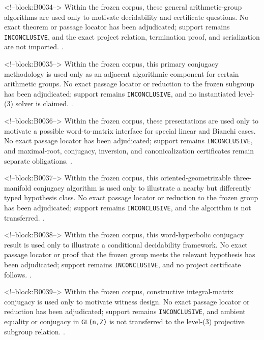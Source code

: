 \documentclass[11pt,a4paper]{article}
\begin{document}
<!--block:B0034-->
Within the frozen corpus, these general arithmetic-group algorithms are used only to motivate decidability and certificate questions. No exact theorem or passage locator has been adjudicated; support remains \texttt{INCONCLUSIVE}, and the exact project relation, termination proof, and serialization are not imported.
\citep{P29-S11}.

<!--block:B0035-->
Within the frozen corpus, this primary conjugacy methodology is used only as an adjacent algorithmic component for certain arithmetic groups. No exact passage locator or reduction to the frozen subgroup has been adjudicated; support remains \texttt{INCONCLUSIVE}, and no instantiated level-(3) solver is claimed.
\citep{P29-S15}.

<!--block:B0036-->
Within the frozen corpus, these presentations are used only to motivate a possible word-to-matrix interface for special linear and Bianchi cases. No exact passage locator has been adjudicated; support remains \texttt{INCONCLUSIVE}, and maximal-root, conjugacy, inversion, and canonicalization certificates remain separate obligations.
\citep{P29-S16}.

<!--block:B0037-->
Within the frozen corpus, this oriented-geometrizable three-manifold conjugacy algorithm is used only to illustrate a nearby but differently typed hypothesis class. No exact passage locator or reduction to the frozen group has been adjudicated; support remains \texttt{INCONCLUSIVE}, and the algorithm is not transferred.
\citep{P29-S12}.

<!--block:B0038-->
Within the frozen corpus, this word-hyperbolic conjugacy result is used only to illustrate a conditional decidability framework. No exact passage locator or proof that the frozen group meets the relevant hypothesis has been adjudicated; support remains \texttt{INCONCLUSIVE}, and no project certificate follows.
\citep{P29-S13}.

<!--block:B0039-->
Within the frozen corpus, constructive integral-matrix conjugacy is used only to motivate witness design. No exact passage locator or reduction has been adjudicated; support remains \texttt{INCONCLUSIVE}, and ambient equality or conjugacy in \texttt{GL(n,Z)} is not transferred to the level-(3) projective subgroup relation.
\citep{P29-S14}.
\end{document}
